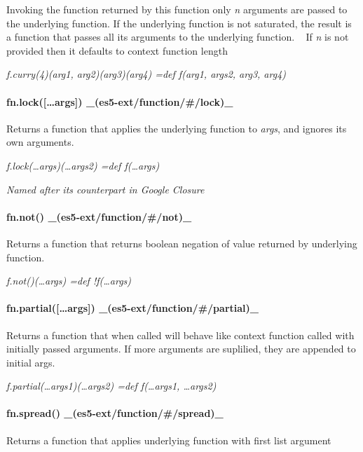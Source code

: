Invoking the function returned by this function only {\itshape n} arguments are passed to the underlying function. If the underlying function is not saturated, the result is a function that passes all its arguments to the underlying function. ~\newline
If {\itshape n} is not provided then it defaults to context function length

{\itshape f.\+curry(4)(arg1, arg2)(arg3)(arg4) =def f(arg1, args2, arg3, arg4)}

\paragraph*{fn.\+lock(\mbox{[}…args\mbox{]}) \+\_\+(es5-\/ext/function/\#/lock)\+\_\+}

Returns a function that applies the underlying function to {\itshape args}, and ignores its own arguments.

{\itshape f.\+lock(…args)(…args2) =def f(…args)}

{\itshape Named after it\textquotesingle{}s counterpart in Google Closure}

\paragraph*{fn.\+not() \+\_\+(es5-\/ext/function/\#/not)\+\_\+}

Returns a function that returns boolean negation of value returned by underlying function.

{\itshape f.\+not()(…args) =def !f(…args)}

\paragraph*{fn.\+partial(\mbox{[}…args\mbox{]}) \+\_\+(es5-\/ext/function/\#/partial)\+\_\+}

Returns a function that when called will behave like context function called with initially passed arguments. If more arguments are suplilied, they are appended to initial args.

{\itshape f.\+partial(…args1)(…args2) =def f(…args1, …args2)}

\paragraph*{fn.\+spread() \+\_\+(es5-\/ext/function/\#/spread)\+\_\+}

Returns a function that applies underlying function with first list argument

